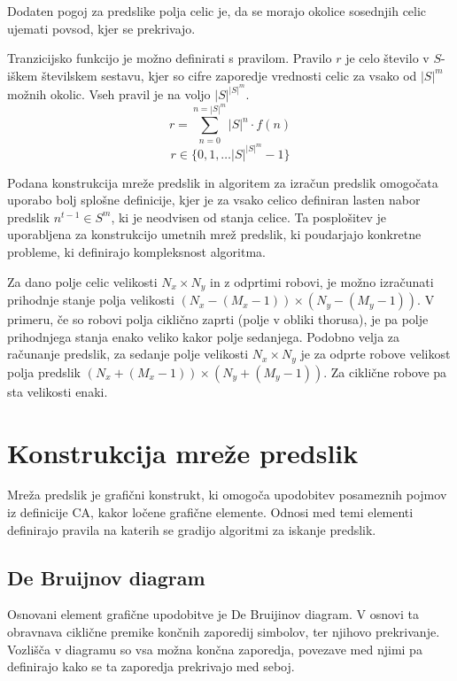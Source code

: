 \documentclass[12pt,a4paper,openany,twoside]{book}
\begin{document}
Dodaten pogoj za predslike polja celic je, da se morajo okolice sosednjih celic
ujemati povsod, kjer se prekrivajo.

Tranzicijsko funkcijo je možno definirati s pravilom.
Pravilo \(r\) je celo število v \(S\)-iškem številskem sestavu,
kjer so cifre zaporedje vrednosti celic za vsako od \(|S|^m\) možnih okolic.
Vseh pravil je na voljo \(|S|^{|S|^m}\).
\begin{equation}
r = \sum_{n=0}^{n=|S|^m} |S|^n \cdot f(n)
\end{equation}
\begin{equation}
r \in \{0, 1, \dots |S|^{|S|^m}-1\}
\end{equation}

Podana konstrukcija mreže predslik in algoritem za izračun predslik omogočata uporabo
bolj splošne definicije, kjer je za vsako celico definiran lasten nabor predslik \( n^{t-1} \in S^m \),
ki je neodvisen od stanja celice. Ta posplošitev je uporabljena za konstrukcijo umetnih
mrež predslik, ki poudarjajo konkretne probleme, ki definirajo kompleksnost algoritma.

Za dano polje celic velikosti \(N_x \times N_y\) in z odprtimi robovi,
je možno izračunati prihodnje stanje polja velikosti \((N_x-(M_x-1)) \times (N_y-(M_y-1))\).
V primeru, če so robovi polja ciklično zaprti (polje v obliki thorusa),
je pa polje prihodnjega stanja enako veliko kakor polje sedanjega.
Podobno velja za računanje predslik, za sedanje polje velikosti \(N_x \times N_y\)
je za odprte robove velikost polja predslik \((N_x+(M_x-1)) \times (N_y+(M_y-1))\).
Za ciklične robove pa sta velikosti enaki.

\chapter{Konstrukcija mreže predslik}

Mreža predslik je grafični konstrukt, ki omogoča upodobitev posameznih pojmov
iz definicije CA, kakor ločene grafične elemente. Odnosi med
temi elementi definirajo pravila na katerih se gradijo algoritmi za iskanje
predslik.

\section{De Bruijnov diagram}

Osnovani element grafične upodobitve je De Bruijinov diagram. V osnovi ta obravnava
ciklične premike končnih zaporedij simbolov, ter njihovo prekrivanje. Vozlišča v
diagramu so vsa možna končna zaporedja, povezave med njimi pa definirajo kako se
ta zaporedja prekrivajo med seboj.
\end{document}
